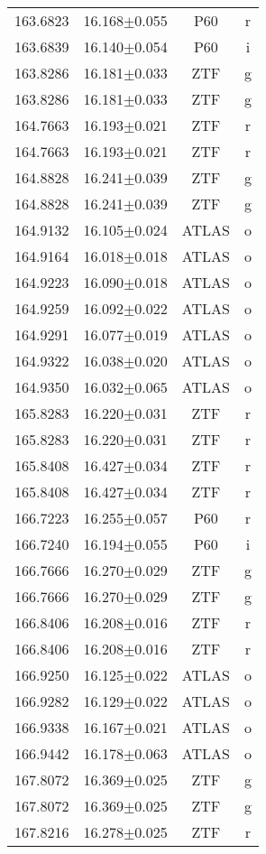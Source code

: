 \begin{table}
\begin{tabular}{cccc}
163.6823 & 16.168$\pm$0.055 & P60 & r \\
163.6839 & 16.140$\pm$0.054 & P60 & i \\
163.8286 & 16.181$\pm$0.033 & ZTF & g \\
163.8286 & 16.181$\pm$0.033 & ZTF & g \\
164.7663 & 16.193$\pm$0.021 & ZTF & r \\
164.7663 & 16.193$\pm$0.021 & ZTF & r \\
164.8828 & 16.241$\pm$0.039 & ZTF & g \\
164.8828 & 16.241$\pm$0.039 & ZTF & g \\
164.9132 & 16.105$\pm$0.024 & ATLAS & o \\
164.9164 & 16.018$\pm$0.018 & ATLAS & o \\
164.9223 & 16.090$\pm$0.018 & ATLAS & o \\
164.9259 & 16.092$\pm$0.022 & ATLAS & o \\
164.9291 & 16.077$\pm$0.019 & ATLAS & o \\
164.9322 & 16.038$\pm$0.020 & ATLAS & o \\
164.9350 & 16.032$\pm$0.065 & ATLAS & o \\
165.8283 & 16.220$\pm$0.031 & ZTF & r \\
165.8283 & 16.220$\pm$0.031 & ZTF & r \\
165.8408 & 16.427$\pm$0.034 & ZTF & r \\
165.8408 & 16.427$\pm$0.034 & ZTF & r \\
166.7223 & 16.255$\pm$0.057 & P60 & r \\
166.7240 & 16.194$\pm$0.055 & P60 & i \\
166.7666 & 16.270$\pm$0.029 & ZTF & g \\
166.7666 & 16.270$\pm$0.029 & ZTF & g \\
166.8406 & 16.208$\pm$0.016 & ZTF & r \\
166.8406 & 16.208$\pm$0.016 & ZTF & r \\
166.9250 & 16.125$\pm$0.022 & ATLAS & o \\
166.9282 & 16.129$\pm$0.022 & ATLAS & o \\
166.9338 & 16.167$\pm$0.021 & ATLAS & o \\
166.9442 & 16.178$\pm$0.063 & ATLAS & o \\
167.8072 & 16.369$\pm$0.025 & ZTF & g \\
167.8072 & 16.369$\pm$0.025 & ZTF & g \\
167.8216 & 16.278$\pm$0.025 & ZTF & r \\

\end{tabular}
\end{table}
